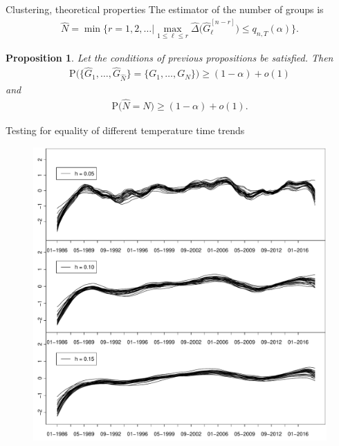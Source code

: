\documentclass[10pt, handout]{beamer}
\newcommand{\Prob}{\mathrm{P}}
\newtheorem{prop}{Proposition}
\begin{document}
\begin{frame}{Clustering, theoretical properties}
The estimator of the number of groups is
\begin{align*}
\widehat{N} = \min \Big\{ r = 1,2,\ldots \Big| \max_{1 \le \ell \le r} \widehat{\Delta} \big( \widehat{G}_\ell^{[n-r]} \big) \le q_{n,T}(\alpha) \Big\}.
\end{align*}\pause
\begin{prop}\label{prop-clustering-1}
Let the conditions of previous propositions be satisfied. Then 
\begin{align*}
\Prob \Big( \big\{ \widehat{G}_1,\ldots,\widehat{G}_{\widehat{N}} \big\} = \{ G_1,\ldots,G_N \} \Big) \ge (1-\alpha) + o(1)
\end{align*}
and 
\begin{align*}
\Prob \big( \widehat{N} = N \big) \ge (1-\alpha) + o(1).
\end{align*}
\end{prop}
\end{frame}
\begin{frame}{Testing for equality of different temperature time trends}
  \begin{figure}
    \centering
    \includegraphics[height=0.85\textheight]{stations_data.pdf}
    \label{figure:station_data}
  \end{figure}
\end{frame}
\end{document}
